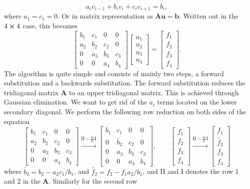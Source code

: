 \documentclass[a4paper,10pt]{article}
\begin{document}
\begin{equation}
a_i v_{i-1} + b_i v_i +c_i v_{i+1} = b_i,
\end{equation}
where $a_1 = c_1 = 0$. Or in matrix representation as $\textbf{A} \mathbf{u} = \mathbf{b}$. Written out in the $4 \cross 4$ case, this becomes
\begin{equation}
\begin{bmatrix}
b_1 & c_1 & 0 & 0 \\
a_2& b_2 & c_2 & 0 \\
0 & a_3 & b_3 & c_3 \\
0 & 0 & a_4 & b_4 
\end{bmatrix}
\begin{bmatrix}
u_1 \\
u_2 \\
u_3 \\
u_4
\end{bmatrix}
=
\begin{bmatrix}
f_1\\
f_2\\
f_3\\
f_4
\end{bmatrix}.
\end{equation}
The algorithm is quite simple and consists of mainly two steps, a forward substitution and a backwards substitution. The forward substitution reduces the tridiagonal matrix $\textbf{A}$ to an upper tridiagonal matrix. This is achieved through Gaussian elimination. We want to get rid of the $a_i$ terms located on the lower secondary diagonal. We perform the following row reduction on both sides of the equation
\[
\begin{bmatrix}
b_1 & c_1 & 0 & 0 \\
a_2& b_2 & c_2 & 0 \\
0 & a_3 & b_3 & c_3 \\
0 & 0 & a_4 & b_4 
\end{bmatrix}
\xrightarrow{\text{II} - \frac{a_2}{b_1}\text{I}}
\begin{bmatrix}
b_1 & c_1 & 0 & 0 \\
0& \tilde{b_2}  & c_2 & 0 \\
0 & a_3 & b_3 & c_3 \\
0 & 0 & a_4 & b_4 
\end{bmatrix}, \qquad
\begin{bmatrix}
f_1\\
f_2\\
f_3\\
f_4
\end{bmatrix}
\xrightarrow{\text{II} - \frac{a_2}{b_1}\text{I}}
\begin{bmatrix}
f_1\\
\tilde{f_2}\\
f_3\\
f_4
\end{bmatrix}
\]
where $\tilde{b_2} = b_2 - a_2c_1/b_1$, and $\tilde{f_2} = f_2 - f_1a_2/b_1$, and II and I denotes the row 1 and 2 in the \textbf{A}. Similarly for the second row
\end{document}
